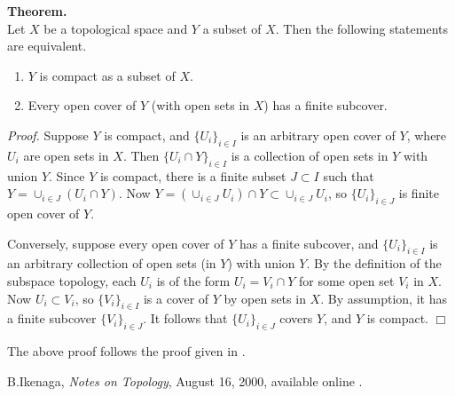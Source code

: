 \documentclass[12pt]{article}
\begin{document}
{\bf Theorem. }\\
Let $X$ be a topological space and $Y$ a subset of $X$. Then the following 
statements are equivalent.
\begin{enumerate}
\item $Y$ is compact as a subset of $X$. 
\item Every open cover of $Y$ (with open sets in $X$) has a finite
subcover.
\end{enumerate}

\emph{Proof.} 
Suppose $Y$ is compact, and $\{U_i\}_{i\in I}$ is an arbitrary 
open cover of $Y$, where $U_i$ are open sets in $X$. Then 
$\{U_i\cap Y\}_{i\in I}$  is a collection of open sets in $Y$ with 
union $Y$. Since $Y$ is compact, there is a finite subset $J\subset I$
such that $Y=\cup_{i\in J} (U_i\cap Y)$. Now 
$Y=(\cup_{i\in J} U_i)\cap Y \subset \cup_{i\in J} U_i$, so
$\{U_i\}_{i\in J}$ is finite open cover of $Y$. 

Conversely, suppose every open cover of $Y$ has a finite subcover, 
and $\{U_i\}_{i\in I}$ is an arbitrary collection of open sets 
(in $Y$) with union $Y$. By the definition of the subspace topology, 
each $U_i$ is of the form $U_i = V_i\cap Y$ for some open set 
$V_i$ in $X$. Now $U_i \subset V_i$, so $\{V_i\}_{i\in I}$ is a cover
of $Y$ by open sets in $X$. By assumption, it has a finite subcover
$\{V_i\}_{i\in J}$. It follows that 
$\{U_i\}_{i\in J}$ covers $Y$, and $Y$ is compact. $\Box$


The above proof follows the proof given in \cite{ikenaga}.
\begin{thebibliography}{9}
 B.Ikenaga, \emph{Notes on Topology}, August 16, 2000, available online
 .
 \end{thebibliography}
\end{document}

